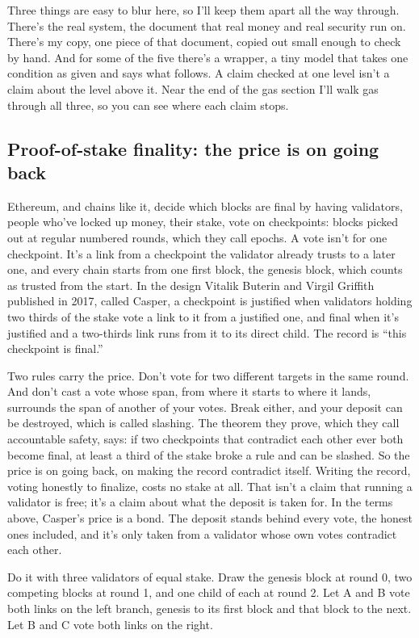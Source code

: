 \documentclass[11pt,twoside]{article}
\theoremstyle{thielethm}
\theoremstyle{thieledef}
\theoremstyle{thieledef}
\theoremstyle{thieledef}
\theoremstyle{thielethm}
\theoremstyle{thieleobs}
\theoremstyle{thielethm}
\begin{document}
Three things are easy to blur here, so I'll keep them apart all the way through. There's the real system, the document that real money and real security run on. There's my copy, one piece of that document, copied out small enough to check by hand. And for some of the five there's a wrapper, a tiny model that takes one condition as given and says what follows. A claim checked at one level isn't a claim about the level above it. Near the end of the gas section I'll walk gas through all three, so you can see where each claim stops.

\subsection{Proof-of-stake finality: the price is on going back}

Ethereum, and chains like it, decide which blocks are final by having validators, people who've locked up money, their stake, vote on checkpoints: blocks picked out at regular numbered rounds, which they call epochs. A vote isn't for one checkpoint. It's a link from a checkpoint the validator already trusts to a later one, and every chain starts from one first block, the genesis block, which counts as trusted from the start. In the design Vitalik Buterin and Virgil Griffith published in 2017, called Casper, a checkpoint is justified when validators holding two thirds of the stake vote a link to it from a justified one, and final when it's justified and a two-thirds link runs from it to its direct child. The record is ``this checkpoint is final.''

Two rules carry the price. Don't vote for two different targets in the same round. And don't cast a vote whose span, from where it starts to where it lands, surrounds the span of another of your votes. Break either, and your deposit can be destroyed, which is called slashing. The theorem they prove, which they call accountable safety, says: if two checkpoints that contradict each other ever both become final, at least a third of the stake broke a rule and can be slashed. So the price is on going back, on making the record contradict itself. Writing the record, voting honestly to finalize, costs no stake at all. That isn't a claim that running a validator is free; it's a claim about what the deposit is taken for. In the terms above, Casper's price is a bond. The deposit stands behind every vote, the honest ones included, and it's only taken from a validator whose own votes contradict each other.

Do it with three validators of equal stake. Draw the genesis block at round 0, two competing blocks at round 1, and one child of each at round 2. Let A and B vote both links on the left branch, genesis to its first block and that block to the next. Let B and C vote both links on the right.
\end{document}
